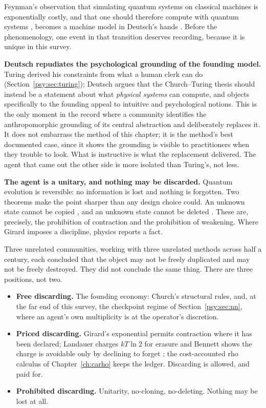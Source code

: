 Feynman's observation that simulating quantum systems on classical
machines is exponentially costly, and that one should therefore
compute with quantum systems \cite{feynman1982}, becomes a machine
model in Deutsch's hands \cite{deutsch1985,deutsch1989}.
Before the phenomenology, one event in that transition deserves
recording, because it is unique in this survey.

\textbf{Deutsch repudiates the psychological grounding of the
founding model.}
Turing derived his constraints from what a human clerk can do
(Section~\ref{psy:sec:turing}); Deutsch argues that the
Church--Turing thesis should instead be a statement about what
\emph{physical systems} can compute, and objects specifically to the
founding appeal to intuitive and psychological notions.
This is the only moment in the record where a community identifies
the anthropomorphic grounding of its central abstraction and
deliberately replaces it.
It does not embarrass the method of this chapter; it is the method's
best documented case, since it shows the grounding is visible to
practitioners when they trouble to look.
What is instructive is what the replacement delivered.
The agent that came out the other side is more isolated than
Turing's, not less.

\textbf{The agent is a unitary, and nothing may be discarded.}
Quantum evolution is reversible: no information is lost and nothing
is forgotten.
Two theorems make the point sharper than any design choice could.
An unknown state cannot be copied \cite{wootters1982}, and an
unknown state cannot be deleted \cite{pati2000}.
These are, precisely, the prohibition of contraction and the
prohibition of weakening.
Where Girard imposes a discipline, physics reports a fact.

\begin{observation}
\label{psy:obs:three}
Three unrelated communities, working with three unrelated methods
across half a century, each concluded that the object may not be
freely duplicated and may not be freely destroyed.
They did not conclude the same thing.
There are three positions, not two.
\begin{itemize}[leftmargin=1.4em,itemsep=0.1em]
\item \textbf{Free discarding.}
The founding economy: Church's structural rules, and, at the far end
of this survey, the checkpoint regime of
Section~\ref{psy:sec:nn}, where an agent's own multiplicity is at
the operator's discretion.
\item \textbf{Priced discarding.}
Girard's exponential permits contraction where it has been declared;
Landauer charges $kT\ln 2$ for erasure \cite{Landauer} and Bennett
shows the charge is avoidable only by declining to forget
\cite{bennett1973}; the cost-accounted rho calculus of
Chapter~\ref{ch:carho} keeps the ledger.
Discarding is allowed, and paid for.
\item \textbf{Prohibited discarding.}
Unitarity, no-cloning, no-deleting.
Nothing may be lost at all.
\end{itemize}
\end{observation}

